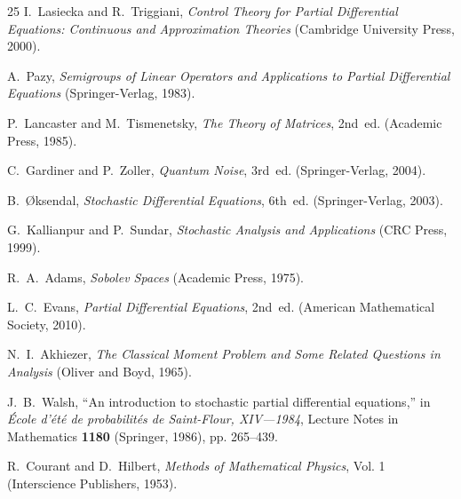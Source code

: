 \documentclass[a4paper,12pt]{article}
\begin{document}
\begin{thebibliography}{25}
 I.~Lasiecka and R.~Triggiani, \emph{Control Theory for Partial Differential Equations: Continuous and Approximation Theories} (Cambridge University Press, 2000).

 A.~Pazy, \emph{Semigroups of Linear Operators and Applications to Partial Differential Equations} (Springer-Verlag, 1983).

 P.~Lancaster and M.~Tismenetsky, \emph{The Theory of Matrices}, 2nd~ed. (Academic Press, 1985).

 C.~Gardiner and P.~Zoller, \emph{Quantum Noise}, 3rd~ed. (Springer-Verlag, 2004).

 B.~\O{}ksendal, \emph{Stochastic Differential Equations}, 6th~ed. (Springer-Verlag, 2003).

 G.~Kallianpur and P.~Sundar, \emph{Stochastic Analysis and Applications} (CRC Press, 1999).

 R.~A.~Adams, \emph{Sobolev Spaces} (Academic Press, 1975).

 L.~C.~Evans, \emph{Partial Differential Equations}, 2nd~ed. (American Mathematical Society, 2010).

 N.~I.~Akhiezer, \emph{The Classical Moment Problem and Some Related Questions in Analysis} (Oliver and Boyd, 1965).

 J.~B.~Walsh, ``An introduction to stochastic partial differential equations,'' in \emph{École d'été de probabilités de Saint-Flour, XIV—1984}, Lecture Notes in Mathematics \textbf{1180} (Springer, 1986), pp. 265--439.

 R.~Courant and D.~Hilbert, \emph{Methods of Mathematical Physics}, Vol. 1 (Interscience Publishers, 1953).

\end{thebibliography}
\end{document}
